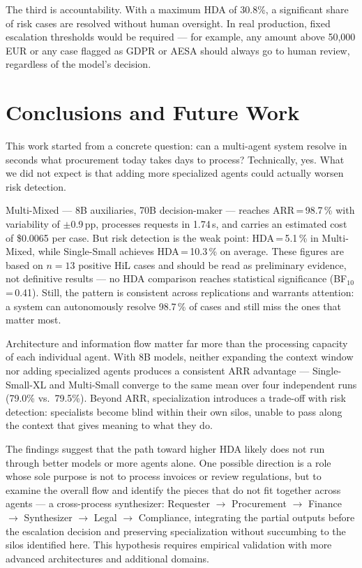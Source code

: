 \documentclass[preprint,12pt,numrefs]{elsarticle}
\begin{document}
The third is accountability. With a maximum HDA of 30.8\%, a
significant share of risk cases are resolved without human oversight.
In real production, fixed escalation thresholds would be required ---
for example, any amount above 50,000\,EUR or any case flagged as GDPR
or AESA should always go to human review, regardless of the model's
decision.

\section{Conclusions and Future Work}
\label{sec:conclusions}

This work started from a concrete question: can a multi-agent system
resolve in seconds what procurement today takes days to process?
Technically, yes. What we did not expect is that adding more specialized
agents could actually worsen risk detection.

Multi-Mixed --- 8B auxiliaries, 70B decision-maker --- reaches
ARR\,=\,98.7\,\% with variability of $\pm$0.9\,pp, processes requests
in 1.74\,s, and carries an estimated cost of \$0.0065 per case. But
risk detection is the weak point: HDA\,=\,5.1\,\% in Multi-Mixed,
while Single-Small achieves HDA\,=\,10.3\,\% on average. These
figures are based on $n=13$ positive HiL cases and should be
read as preliminary evidence, not definitive results --- no
HDA comparison reaches statistical significance
(BF$_{10}$\,=\,0.41). Still, the pattern is consistent across
replications and warrants attention: a system can autonomously
resolve 98.7\,\% of cases and still miss the ones that matter most.

Architecture and information flow matter far more than the processing
capacity of each individual agent. With 8B models, neither expanding
the context window nor adding specialized agents produces a consistent
ARR advantage --- Single-Small-XL and Multi-Small converge to the same
mean over four independent runs (79.0\% vs.\ 79.5\%). Beyond ARR,
specialization introduces a trade-off with risk detection: specialists
become blind within their own silos, unable to pass along the context
that gives meaning to what they do.

The findings suggest that the path toward higher HDA likely does not
run through better models or more agents alone. One possible direction
is a role whose sole purpose is not to process invoices or review
regulations, but to examine the overall flow and identify the pieces
that do not fit together across agents --- a cross-process synthesizer:
Requester $\to$ Procurement $\to$ Finance $\to$ Synthesizer $\to$
Legal $\to$ Compliance, integrating the partial outputs before the
escalation decision and preserving specialization without succumbing to
the silos identified here. This hypothesis requires empirical validation
with more advanced architectures and additional domains.
\end{document}
